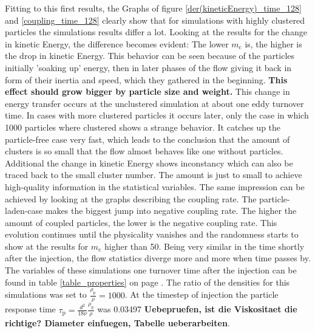 \documentclass[11pt,a4paper,openany,oneside,parskip=half*]{article}
\begin{document}
Fitting to this first results, the Graphs of figure \ref{der(kineticEnergy)_time_128} and \ref{coupling_time_128} clearly show that for simulations with highly clustered particles the simulations results differ a lot. Looking at the results for the change in kinetic Energy, the difference becomes evident: The lower $ m_\mathrm{c} $ is, the higher is the drop in kinetic Energy. This behavior can be seen because of the particles initially 'soaking up' energy, then in later phases of the flow giving it back in form of their inertia and speed, which they gathered in the beginning. \textbf{This effect should grow bigger by particle size and weight.} This change in energy transfer occurs at the unclustered simulation at about one eddy turnover time. In cases with more clustered particles it occurs later, only the case in which 1000 particles where clustered shows a strange behavior. It catches up the particle-free case very fast, which leads to the conclusion that the amount of clusters is so small that the flow almost behaves like one without particles. Additional the change in kinetic Energy shows inconstancy which can also be traced back to the small cluster number. The amount is just to small to achieve high-quality information in the statistical variables. 
\newline
The same impression can be achieved by looking at the graphs describing the coupling rate. The particle-laden-case makes the biggest jump into negative coupling rate. The higher the amount of coupled particles, the lower is the negative coupling rate. This evolution continues until the physicality vanishes and the randomness starts to show at the results for $m_\mathrm{c}$ higher than 50. 
\newline
Being very similar in the time shortly after the injection, the flow statistics diverge more and more when time passes by. The variables of these simulations one turnover time after the injection can be found in table \ref{table_properties} on page \pageref{table_properties}. The ratio of the densities for this simulations was set to $\frac{\rho_\mathrm{p}}{\rho} = 1000$. At the timestep of injection the particle response time $\tau_\mathrm{p}=\frac{d^2}{18 \nu} \frac{\rho_\mathrm{p}}{\rho}$ was 0.03497 \textbf{Uebepruefen, ist die Viskositaet die richtige? Diameter einfuegen, Tabelle ueberarbeiten}.
\end{document}
